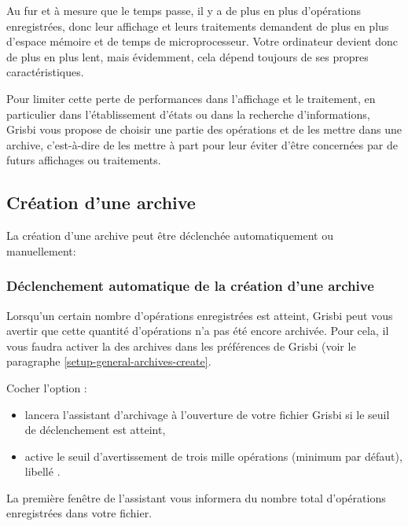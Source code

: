 \vspace{.2em}
Au fur et à mesure que le temps passe, il y a de plus en plus d'opérations enregistrées, donc leur affichage et leurs traitements demandent de plus en plus d'espace mémoire et de temps de microprocesseur. Votre ordinateur devient donc de plus en plus lent, mais évidemment, cela dépend toujours de ses propres caractéristiques.

\vspace{.2em}
Pour limiter cette perte de performances dans l'affichage et le traitement, en particulier dans l'établissement d'états ou dans la recherche d'informations, Grisbi vous propose de choisir une partie des opérations et de les mettre dans une archive, c'est-à-dire de les mettre à part pour leur éviter d'être concernées par de futurs affichages ou traitements.


\subsection{Création d'une archive\label{datamanagement-archive-new}}

La création d'une archive peut être déclenchée automatiquement ou manuellement:

\subsubsection{Déclenchement automatique de la création d'une archive\label{datamanagement-archive-auto}}

Lorsqu'un certain nombre d'opérations enregistrées est atteint, Grisbi peut vous avertir que cette quantité d'opérations n'a pas été encore archivée. Pour cela, il vous faudra activer la  des archives dans les préférences de Grisbi (voir le paragraphe \vref{setup-general-archives-create}. 

\vspace{.5em}
Cocher l'option :
\begin{itemize}
	 \item lancera l'assistant d'archivage à l'ouverture de votre fichier Grisbi si le seuil de déclenchement est atteint, 
	 \item active le seuil d'avertissement de trois mille opérations (minimum par défaut), libellé .
\end{itemize}

La première fenêtre de l'assistant  vous informera du nombre total d'opérations enregistrées dans votre fichier.

